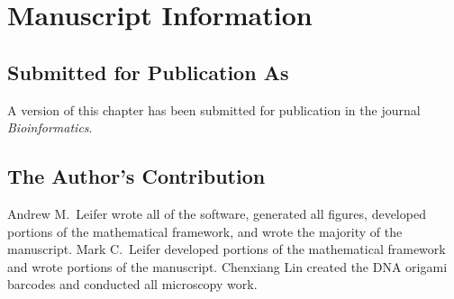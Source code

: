 \section{Manuscript Information}
\subsection{Submitted for Publication As}
A version of this chapter has been submitted for publication in the journal \textit{Bioinformatics}.

\subsection{The Author's Contribution}
Andrew M.~Leifer wrote all of the software, generated all figures, developed portions of the mathematical framework, and wrote the majority of the manuscript. Mark C.~Leifer developed portions of the mathematical framework and wrote portions of the manuscript. Chenxiang Lin created the DNA origami barcodes and conducted all microscopy work. 
 
